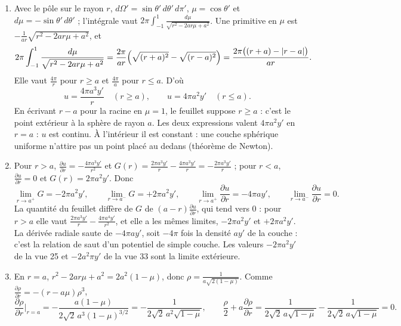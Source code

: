 \documentclass[11pt,a4paper]{article}
\begin{document}
\begin{solution}
\begin{enumerate}
\item Avec le pôle sur le rayon $r$, $d\Omega' = \sin\theta'\,d\theta'\,d\pi'$,
  $\mu = \cos\theta'$ et $d\mu = -\sin\theta'\,d\theta'$ ; l'intégrale vaut
  $2\pi\int_{-1}^{1}\frac{d\mu}{\sqrt{r^2 - 2ar\mu + a^2}}$. Une primitive en $\mu$ est
  $-\frac{1}{ar}\sqrt{r^2 - 2ar\mu + a^2}$, et
  \[
  2\pi\int_{-1}^{1}\frac{d\mu}{\sqrt{r^2 - 2ar\mu + a^2}}
  = \frac{2\pi}{ar}\Bigl(\sqrt{(r+a)^2} - \sqrt{(r-a)^2}\Bigr)
  = \frac{2\pi\bigl((r+a) - |r-a|\bigr)}{ar}.
  \]
  Elle vaut $\frac{4\pi}{r}$ pour $r \ge a$ et $\frac{4\pi}{a}$ pour $r \le a$. D'où
  \[
  u = \frac{4\pi a^3y'}{r}\quad(r \ge a), \qquad u = 4\pi a^2y'\quad(r \le a).
  \]
  En écrivant $r - a$ pour la racine en $\mu = 1$, le feuillet suppose $r \ge a$ :
  c'est le point extérieur à la sphère de rayon $a$. Les deux expressions valent
  $4\pi a^2y'$ en $r = a$ : $u$ est continu. À l'intérieur il est constant : une
  couche sphérique uniforme n'attire pas un point placé au dedans (théorème de
  Newton).
\item Pour $r > a$, $\frac{\partial u}{\partial r} = -\frac{4\pi a^3y'}{r^2}$ et
  $G(r) = \frac{2\pi a^3y'}{r} - \frac{4\pi a^3y'}{r} = -\frac{2\pi a^3y'}{r}$ ; pour
  $r < a$, $\frac{\partial u}{\partial r} = 0$ et $G(r) = 2\pi a^2y'$. Donc
  \[
  \lim_{r\to a^+}G = -2\pi a^2y', \qquad \lim_{r\to a^-}G = +2\pi a^2y', \qquad
  \lim_{r\to a^+}\frac{\partial u}{\partial r} = -4\pi ay', \qquad
  \lim_{r\to a^-}\frac{\partial u}{\partial r} = 0 .
  \]
  La quantité du feuillet diffère de $G$ de $(a - r)\frac{\partial u}{\partial r}$,
  qui tend vers $0$ : pour $r > a$ elle vaut
  $\frac{2\pi a^3y'}{r} - \frac{4\pi a^4y'}{r^2}$, et elle a les mêmes limites,
  $-2\pi a^2y'$ et $+2\pi a^2y'$. La dérivée radiale saute de $-4\pi ay'$, soit
  $-4\pi$ fois la densité $ay'$ de la couche : c'est la relation de saut d'un
  potentiel de simple couche. Les valeurs $-2\pi a^2y'$ de la vue 25 et
  $-2a^2\pi y'$ de la vue 33 sont la limite extérieure.
\item En $r = a$, $r^2 - 2ar\mu + a^2 = 2a^2(1-\mu)$, donc
  $\rho = \frac{1}{a\sqrt{2(1-\mu)}}$. Comme
  $\frac{\partial\rho}{\partial r} = -(r - a\mu)\rho^3$,
  \[
  \frac{\partial\rho}{\partial r}\Big|_{r=a}
  = -\frac{a(1-\mu)}{2\sqrt2\,a^3(1-\mu)^{3/2}}
  = -\frac{1}{2\sqrt2\,a^2\sqrt{1-\mu}},
  \qquad
  \frac\rho2 + a\frac{\partial\rho}{\partial r}
  = \frac{1}{2\sqrt2\,a\sqrt{1-\mu}} - \frac{1}{2\sqrt2\,a\sqrt{1-\mu}} = 0 .
  \]

\end{enumerate}
\end{solution}
\end{document}
